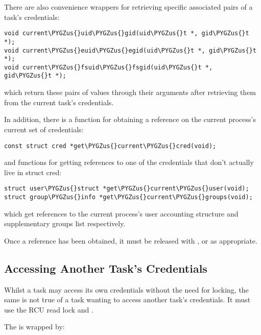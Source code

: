 \documentclass[a4paper,8pt,english]{sphinxmanual}
\def\PYGZus{\char`\_}
\begin{document}
There are also convenience wrappers for retrieving specific associated pairs of
a task's credentials:

\begin{Verbatim}[commandchars=\\\{\}]
void current\PYGZus{}uid\PYGZus{}gid(uid\PYGZus{}t *, gid\PYGZus{}t *);
void current\PYGZus{}euid\PYGZus{}egid(uid\PYGZus{}t *, gid\PYGZus{}t *);
void current\PYGZus{}fsuid\PYGZus{}fsgid(uid\PYGZus{}t *, gid\PYGZus{}t *);
\end{Verbatim}

which return these pairs of values through their arguments after retrieving
them from the current task's credentials.

In addition, there is a function for obtaining a reference on the current
process's current set of credentials:

\begin{Verbatim}[commandchars=\\\{\}]
const struct cred *get\PYGZus{}current\PYGZus{}cred(void);
\end{Verbatim}

and functions for getting references to one of the credentials that don't
actually live in struct cred:

\begin{Verbatim}[commandchars=\\\{\}]
struct user\PYGZus{}struct *get\PYGZus{}current\PYGZus{}user(void);
struct group\PYGZus{}info *get\PYGZus{}current\PYGZus{}groups(void);
\end{Verbatim}

which get references to the current process's user accounting structure and
supplementary groups list respectively.

Once a reference has been obtained, it must be released with ,
 or  as appropriate.


\subsection{Accessing Another Task's Credentials}
\label{security/credentials:accessing-another-task-s-credentials}
Whilst a task may access its own credentials without the need for locking, the
same is not true of a task wanting to access another task's credentials.  It
must use the RCU read lock and .

The  is wrapped by:
\end{document}
